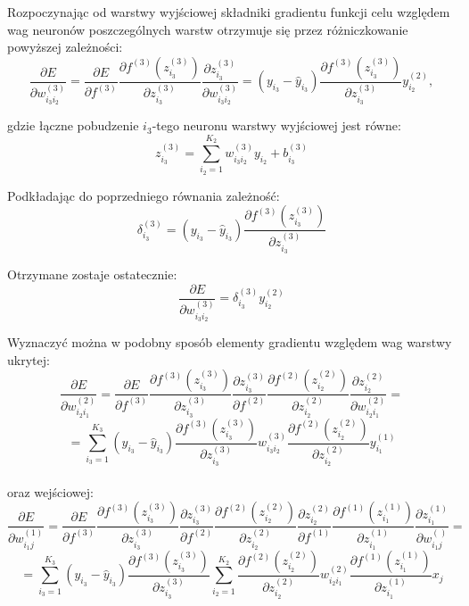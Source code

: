 \documentclass[a4paper, 12pt]{report}
\begin{document}
Rozpoczynając od warstwy wyjściowej składniki gradientu funkcji celu względem wag neuronów poszczególnych warstw otrzymuje się przez różniczkowanie powyższej zależności:
$$ \frac{\partial E}{\partial w_{i_{3} i_{2}}^{(3)}}=\frac{\partial E}{\partial f^{(3)}} \frac{\partial f^{(3)}\left(z_{i_{3}}^{(3)}\right)}{\partial z_{i_{3}}^{(3)}} \frac{\partial z_{i_{3}}^{(3)}}{\partial w_{i_{3} i_{2}}^{(3)}} = ( y_{i_3}-\hat{y}_{i_3} ) \frac{\partial f^{(3)}\left(z_{i_3}^{(3)}\right)}{\partial z_{i_{3}}^{(3)}} y^{(2)}_{i_2}, $$

gdzie łączne pobudzenie $i_3$-tego neuronu warstwy wyjściowej jest równe:
$$z_{i_{3}}^{(3)} = \sum_{i_2=1}^{K_2} w^{(3)}_{i_3 i_2}y_{i_2} + b^{(3)}_{i_3}$$

Podkładając do poprzedniego równania zależność:
$$\delta^{(3)}_{i_3} = ( y_{i_3}-\hat{y}_{i_3} ) \frac{\partial f^{(3)}\left(z_{i_3}^{(3)}\right)}{\partial z_{i_{3}}^{(3)}} $$

Otrzymane zostaje ostatecznie:
$$ \frac{\partial E}{\partial w_{i_{3} i_{2}}^{(3)}} = \delta^{(3)}_{i_3} y^{(2)}_{i_2}$$

\newpage
Wyznaczyć można w podobny sposób elementy gradientu względem wag warstwy ukrytej:
$$ \frac{\partial E}{\partial w_{i_{2} i_{1}}^{(2)}}=\frac{\partial E}{\partial f^{(3)}} \frac{\partial f^{(3)}\left(z_{i_{3}}^{(3)}\right)}{\partial z_{i_{3}}^{(3)}} \frac{\partial z_{i_{3}}^{(3)}}{\partial f^{(2)}} \frac{\partial f^{(2)}\left(z_{i_{2}}^{(2)}\right)}{\partial z_{i_{2}}^{(2)}} \frac{\partial z_{i_{2}}^{(2)}}{\partial w_{i_{2} i_{1}}^{(2)}}= $$
 $$ =\sum_{i_{3}=1}^{K_{3}}\left(y_{i_{3}}-\hat{y}_{i_{3}}\right) \frac{\partial f^{(3)}\left(z_{i_{3}}^{(3)}\right)}{\partial z_{i_{3}}^{(3)}} w_{i_{3} i_{2}}^{(3)} \frac{\partial f^{(2)}\left(z_{i_{2}}^{(2)}\right)}{\partial z_{i_{2}}^{(2)}} y_{i_{1}}^{(1)} $$\\

oraz wejściowej:
$$ \frac{\partial E}{\partial w_{i_{1} j}^{(1)}}=\frac{\partial E}{\partial f^{(3)}} \frac{\partial f^{(3)}\left(z_{i_{3}}^{(3)}\right)}{\partial z_{i_{3}}^{(3)}} \frac{\partial z_{i_{3}}^{(3)}}{\partial f^{(2)}} \frac{\partial f^{(2)}\left(z_{i_{2}}^{(2)}\right)}{\partial z_{i_{2}}^{(2)}} \frac{\partial z_{i_{2}}^{(2)}}{\partial f^{(1)}}\frac{\partial f^{(1)}\left(z_{i_{1}}^{(1)}\right)}{\partial z_{i_{1}}^{(1)}} \frac{\partial z_{i_{1}}^{(1)}}{\partial w_{i_{1} j}^{()}}= $$
 $$ =\sum_{i_{3}=1}^{K_{3}}\left(y_{i_{3}}-\hat{y}_{i_{3}}\right) \frac{\partial f^{(3)}\left(z_{i_{3}}^{(3)}\right)}{\partial z_{i_{3}}^{(3)}} \sum_{i_{2}=1}^{K_{2}} \frac{\partial f^{(2)}\left(z_{i_{2}}^{(2)}\right)}{\partial z_{i_{2}}^{(2)}} w_{i_{2} i_{1}}^{(2)} \frac{\partial f^{(1)}\left(z_{i_{1}}^{(1)}\right)}{\partial z_{i_{1}}^{(1)}} x_j$$\\
\end{document}
